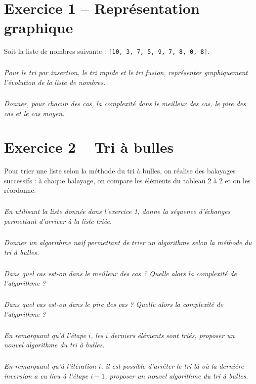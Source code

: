 \documentclass[10pt,fleqn]{article} %
\begin{document}

\vspace{8cm}
\pagestyle{fancy}
\thispagestyle{plain}


\def\columnseprulecolor{\color{ocre}}
\setlength{\columnseprule}{0.4pt} 
\begin{multicols}{2}

\section*{Exercice 1 -- Représentation graphique}
Soit la liste de nombres suivante : \texttt{[10, 3, 7, 5, 9, 7, 8, 0, 8]}.

\subparagraph{}
\textit{Pour le tri par insertion, le tri rapide et le tri fusion, représenter graphiquement l'évolution de la liste de nombres.}

\subparagraph{}
\textit{Donner, pour chacun des cas, la complexité dans le meilleur des cas, le pire des cas et le cas moyen.}

\section*{Exercice 2 -- Tri à bulles}
Pour trier une liste selon la méthode du tri à bulles, on réalise des balayages successifs : à chaque balayage, on compare les éléments du tableau 2 à 2 et on les réordonne. 
\setcounter{exo}{0}

\subparagraph{}
\textit{En utilisant la liste donnée dans l'exercice 1, donne la séquence d'échanges permettant d'arriver à la liste triée.}

\subparagraph{}
\textit{Donner un algorithme naïf permettant de trier un algorithme selon la méthode du tri à bulles.}
\ifprof
\begin{corrige}
\end{corrige}
\else
\fi


\subparagraph{}
\textit{Dans quel cas est-on dans le meilleur des cas ? Quelle alors la complexité de l'algorithme ?}

\subparagraph{}
\textit{Dans quel cas est-on dans le pire des cas ? Quelle alors la complexité de l'algorithme ?}


\subparagraph{}
\textit{En remarquant qu'à l'étape $i$, les $i$ derniers éléments sont triés, proposer un nouvel algorithme du tri à bulles.}

\subparagraph{}
\textit{En remarquant qu'à l'itération $i$, il est possible d'arrêter le tri là où la dernière inversion a eu lieu à l'étape $i-1$, proposer un nouvel algorithme du tri à bulles.}


\end{multicols}
\end{document}
